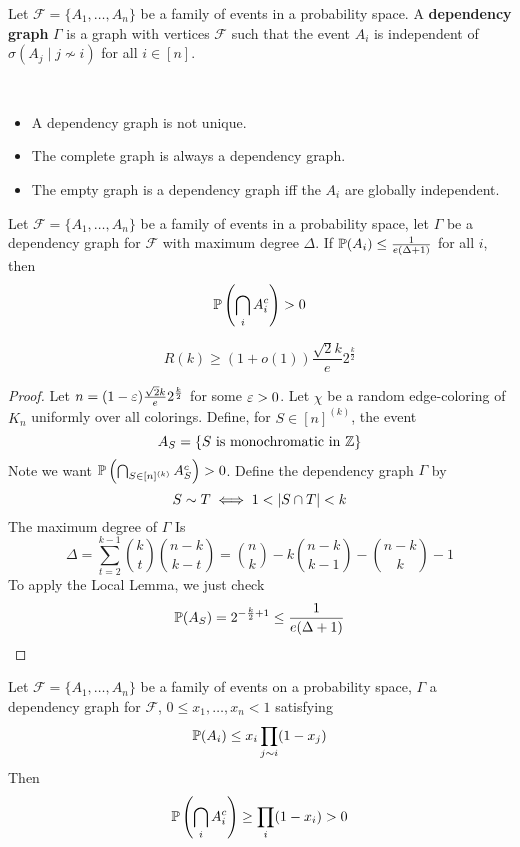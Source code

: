 \documentclass{article}
\begin{document}
\begin{defi}
  Let $\mathcal F = \{A_1, \dots, A_n\}$ be a family of events in a probability space. A {\bf dependency graph} $\Gamma$ is a graph with vertices $\mathcal F$ such that the event $A_i$ is independent of $\sigma(A_j \mid j \not\sim i)$ for all $i \in [n]$.
\end{defi}

\begin{rmks}~
  \begin{itemize}
    \item A dependency graph is not unique.
    \item The complete graph is always a dependency graph.
    \item The empty graph is a dependency graph iff the $A_i$ are globally independent.
  \end{itemize}
\end{rmks}

\begin{thm}
  Let $\mathcal F = \{A_1, \dots, A_n\}$ be a family of events in a probability space, let $\Gamma$ be a dependency graph for $\mathcal F$ with maximum degree $\Delta$. If $\P(A_i) \le \frac 1{e(\Delta + 1)}$ for all $i$, then
  $$\P\left(\Inter_i A_i^c\right) > 0$$
\end{thm}

\begin{thm}[Spencer]
  $$R(k) \ge (1 + o(1)) \frac{\sqrt 2k}e 2^{\frac k2}$$
\end{thm}
\begin{proof}
  Let $n = (1 - \eps)\frac{\sqrt 2k}e2^{\frac k2}$ for some $\eps > 0$. Let $\chi$ be a random edge-coloring of $K_n$ uniformly over all colorings. Define, for $S \in [n]^{(k)}$, the event
  $$A_S = \{S \text{ is monochromatic in } \Z\}$$
  Note we want $\P\left(\Inter_{S \in [n]^{(k)}} A_S^c\right) > 0$. Define the dependency graph $\Gamma$ by
  $$S \sim T \iff 1 < \abs{S \inter T} < k$$
  The maximum degree of $\Gamma$ Is
  $$\Delta = \sum_{t = 2}^{k - 1}\binom kt\binom{n - k}{k - t} = \binom nk - k\binom{n - k}{k - 1} - \binom{n - k}k - 1$$
  To apply the Local Lemma, we just check
  $$\P(A_S) = 2^{-\frac k2 + 1} \le \frac 1{e(\Delta + 1)}$$
\end{proof}

\begin{thm}
  Let $\mathcal F = \{A_1, \dots, A_n\}$ be a family of events on a probability space, $\Gamma$ a dependency graph for $\mathcal F$, $0 \le x_1, \dots, x_n < 1$ satisfying
  $$\P(A_i) \le x_i \prod_{j \sim i}(1 - x_j)$$
  Then
  $$\P\left(\Inter_i A_i^c\right) \ge \prod_i (1 - x_i) > 0$$
\end{thm}
\end{document}
